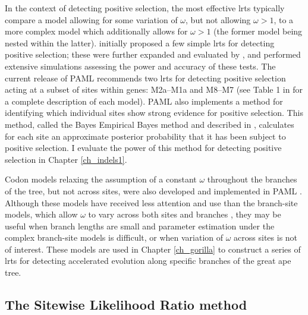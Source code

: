 In the context of detecting positive selection, the most effective
\acp{lrt} typically compare a model allowing for some variation of
$\omega$, but not allowing $\omega>1$, to a more complex model which
additionally allows for $\omega>1$ (the former model being nested
within the latter). \citet{Nielsen1998} initially proposed a few
simple \acp{lrt} for detecting positive selection; these were further
expanded and evaluated by \citet{Yang2000CodonSubstitution}, and
\citet{Anisimova2001} performed extensive simulations assessing the
power and accuracy of these tests. The current release of PAML
recommends two \acp{lrt} for detecting positive selection acting at a
subset of sites within genes: \mbox{M2a--M1a} and \mbox{M8--M7} (see
Table 1 in \citet{Wong2004} for a complete description of each
model). PAML also implements a method for identifying which individual
sites show strong evidence for positive selection. This method, called
the Bayes Empirical Bayes method and described in
\citet{Yang2005Bayes}, calculates for each site an approximate
posterior probability that it has been subject to positive
selection. I evaluate the power of this method for detecting \sw
positive selection in Chapter \ref{ch_indels1}.

Codon models relaxing the assumption of a constant $\omega$ throughout
the branches of the tree, but not across sites, were also developed
and implemented in PAML \citep{Yang1998,Yang1998a}. Although these
models have received less attention and use than the branch-site
models, which allow $\omega$ to vary across both sites and branches
\citep{Zhang2005}, they may be useful when branch lengths are small
and parameter estimation under the complex branch-site models is
difficult, or when variation of $\omega$ across sites is not of
interest. These models are used in Chapter \ref{ch_gorilla} to
construct a series of \acp{lrt} for detecting accelerated evolution
along specific branches of the great ape tree.

\subsection{The Sitewise Likelihood Ratio method}

